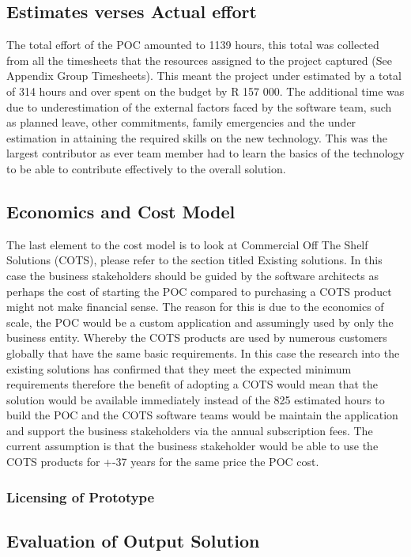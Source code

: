 \documentclass[12pt]{witseiepaper}
\begin{document}
\subsection{Estimates verses Actual effort}
The total effort of the POC amounted to 1139 hours, this total was collected from all the timesheets that the resources assigned to the project captured (See Appendix Group Timesheets). This meant the project under estimated by a total of 314 hours and over spent on the budget by R 157 000.  The additional time was due to underestimation of the external factors faced by the software team, such as planned leave, other commitments, family emergencies and the under estimation in attaining the required skills on the new technology. This was the largest contributor as ever team member had to learn the basics of the technology to be able to contribute effectively to the overall solution.

\subsection{Economics and Cost Model}
The last element to the cost model is to look at Commercial Off The Shelf Solutions (COTS),  please refer to the section titled Existing solutions. In this case the business stakeholders should be guided by the software architects as perhaps the cost of starting the POC compared to purchasing a COTS product might not make financial sense. The reason for this is due to the economics of scale, the POC would be a custom application and assumingly used by only the business entity. Whereby the COTS products are used by numerous customers globally that have the same basic requirements. In this case the research into the existing solutions has confirmed that they meet the expected minimum requirements therefore the benefit of adopting a COTS would mean that the solution would be available immediately instead of the 825 estimated hours to build the POC and the COTS software teams would be maintain the application and support the business stakeholders via the annual subscription fees. The current assumption is that the business stakeholder would be able to use the COTS products for +-37 years for the same price the POC cost.


\subsubsection{Licensing of Prototype}


\subsection{Evaluation of Output Solution}
\end{document}

